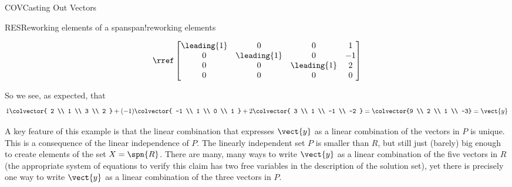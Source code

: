 \begin{subsect}{COV}{Casting Out Vectors}
\begin{example}{RES}{Reworking elements of a span}{span!reworking elements}
\begin{para}
\begin{equation*}
\rref
\begin{bmatrix}
 \leading{1} & 0  & 0 & 1 \\
 0 & \leading{1} & 0 & -1 \\
 0 & 0 & \leading{1} & 2 \\
 0 & 0 & 0 & 0
\end{bmatrix}
\end{equation*}
\end{para}
%
\begin{para}So we see, as expected, that
%
\begin{equation*}
1\colvector{ 2 \\ 1 \\ 3 \\ 2 }+
(-1)\colvector{ -1 \\ 1 \\ 0 \\ 1 }+
2\colvector{ 3 \\ 1 \\ -1 \\ -2 }
=\colvector{9 \\ 2 \\ 1 \\ -3}
=\vect{y}
\end{equation*}\end{para}
%
\begin{para}A key feature of this example is that the linear combination that expresses $\vect{y}$ as a linear combination of the vectors in $P$ is unique.  This is a consequence of the linear independence of $P$.  The linearly independent set $P$ is smaller than $R$, but still just (barely) big enough to create elements of the set $X=\spn{R}$.  There are many, many ways to write $\vect{y}$ as a linear combination of the five vectors in $R$ (the appropriate system of equations to verify this claim has two free variables in the description of the solution set), yet there is precisely one way to write $\vect{y}$ as a linear combination of the three vectors in $P$.\end{para}
\end{example}
%
%
\end{subsect}
%

